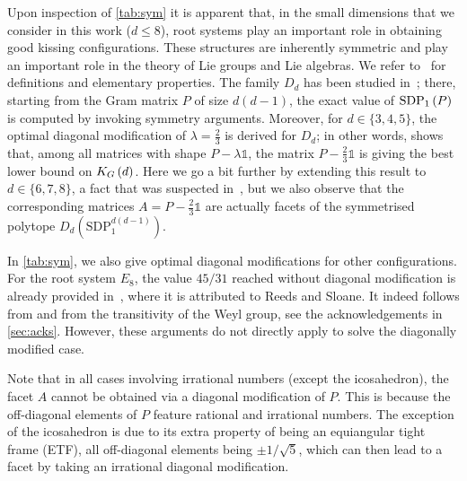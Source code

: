 \documentclass[10pt,aps,notitlepage,onecolumn,pra,superscriptaddress]{revtex4-1}
\renewcommand{\leq}{\leqslant}
\newcommand\cut[2]{\mathrm{SDP}_{#1}^{#2}}
\newcommand{\id}{\mathds{1}}
\newcommand\KG[2]{K_G\left({#1}\ifx#2\empty\else\mapsto\fi{#2}\right)}
\newcommand\sdp[2]{\mathrm{SDP}_{#1}\ifx#2\empty\else\left({#2}\right)\fi}
\begin{document}
Upon inspection of \cref{tab:sym} it is apparent that, in the small dimensions that we consider in this work ($d\leq8$), root systems play an important role in obtaining good kissing configurations.
These structures are inherently symmetric and play an important role in the theory of Lie groups and Lie algebras.
We refer to~\cite{Bak02} for definitions and elementary properties.
The family $D_d$ has been studied in~\cite{FR94}; there, starting from the Gram matrix $P$ of size $d(d-1)$, the exact value of $\sdp{1}{P}$ is computed by invoking symmetry arguments.
Moreover, for $d\in\{3, 4, 5\}$, the optimal diagonal modification of $\lambda=\frac23$ is derived for $D_d$; in other words, \cite{FR94} shows that, among all matrices with shape $P-\lambda\id$, the matrix $P-\frac23\id$ is giving the best lower bound on $\KG{d}{}$.
Here we go a bit further by extending this result to $d\in\{6, 7, 8\}$, a fact that was suspected in~\cite{FR94}, but we also observe that the corresponding matrices $A=P-\frac23\id$ are actually facets of the symmetrised polytope $D_d(\cut{1}{d(d-1)})$.

In \cref{tab:sym}, we also give optimal diagonal modifications for other configurations.
For the root system $E_8$,
the value $45/31$ reached without diagonal modification is already provided in~\cite[page~50]{FR94}, where it is attributed to Reeds and Sloane.
It indeed follows from \cite[Lemma~2]{FR94} and from the transitivity of the Weyl group, see the acknowledgements in \cref{sec:acks}.
However, these arguments do not directly apply to solve the diagonally modified case.

Note that in all cases involving irrational numbers (except the icosahedron), the facet $A$ cannot be obtained via a diagonal modification of $P$.
This is because the off-diagonal elements of $P$ feature rational and irrational numbers.
The exception of the icosahedron is due to its extra property of being an equiangular tight frame (ETF), all off-diagonal elements being $\pm1/\sqrt5$, which can then lead to a facet by taking an irrational diagonal modification.
\end{document}
